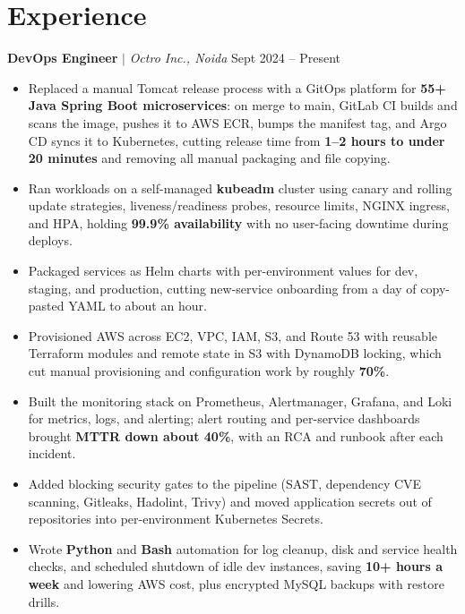 \documentclass[10pt, letterpaper]{article}
\begin{document}
\section*{Experience}
\vspace{0pt}
\textbf{DevOps Engineer} $|$ \emph{Octro Inc., Noida} \hfill Sept 2024 -- Present
\begin{itemize}
    \item Replaced a manual Tomcat release process with a GitOps platform for \textbf{55+ Java Spring Boot microservices}: on merge to main, GitLab CI builds and scans the image, pushes it to AWS ECR, bumps the manifest tag, and Argo CD syncs it to Kubernetes, cutting release time from \textbf{1--2 hours to under 20 minutes} and removing all manual packaging and file copying.
    \item Ran workloads on a self-managed \textbf{kubeadm} cluster using canary and rolling update strategies, liveness/readiness probes, resource limits, NGINX ingress, and HPA, holding \textbf{99.9\% availability} with no user-facing downtime during deploys.
    \item Packaged services as Helm charts with per-environment values for dev, staging, and production, cutting new-service onboarding from a day of copy-pasted YAML to about an hour.
    \item Provisioned AWS across EC2, VPC, IAM, S3, and Route 53 with reusable Terraform modules and remote state in S3 with DynamoDB locking, which cut manual provisioning and configuration work by roughly \textbf{70\%}.
    \item Built the monitoring stack on Prometheus, Alertmanager, Grafana, and Loki for metrics, logs, and alerting; alert routing and per-service dashboards brought \textbf{MTTR down about 40\%}, with an RCA and runbook after each incident.
    \item Added blocking security gates to the pipeline (SAST, dependency CVE scanning, Gitleaks, Hadolint, Trivy) and moved application secrets out of repositories into per-environment Kubernetes Secrets.
    \item Wrote \textbf{Python} and \textbf{Bash} automation for log cleanup, disk and service health checks, and scheduled shutdown of idle dev instances, saving \textbf{10+ hours a week} and lowering AWS cost, plus encrypted MySQL backups with restore drills.
\end{itemize}

\end{document}
